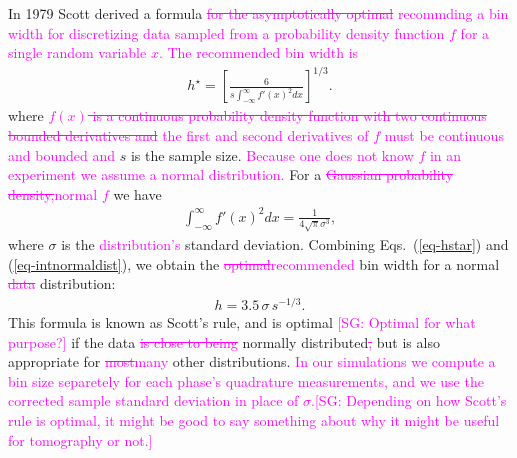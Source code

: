 \documentclass[
reprint,
superscriptaddress,
showpacs,
amsmath,
amssymb,
aps,
pra,
longbibliography
]{revtex4-1}
\providecommand{\aucmnt}[1]{#1}
\providecommand{\editcolor}[2]{\textcolor{#1}{#2}}
\providecommand{\aucmnt}[1]{}
\providecommand{\editcolor}[2]{#2}
\newcommand{\SG}[1]{\editcolor{magenta}{#1}}
\newcommand{\SGs}[1]{\aucmnt{\editcolor{magenta}{\sout{#1}}}}
\newcommand{\SGc}[1]{\aucmnt{\editcolor{magenta}{[SG: #1]}}}
\begin{document}
In 1979 Scott derived a formula \SGs{for the asymptotically optimal}
\SG{recommding a bin width for discretizing data sampled from a
  probability density function $f$ for a single random variable
  $x$. The recommended bin width is}
\begin{eqnarray}
  h^{\star} = \left[ \frac{6}{s \int_{-\infty}^{\infty} f'(x)^2 dx} \right]^{1/3}.
  \label{eq-hstar}
\end{eqnarray}
where \SGs{$f(x)$ is a continuous probability density function with
  two continuous bounded derivatives and} \SG{the first and second
  derivatives of $f$ must be continuous and bounded and} $s$ is the
sample size. \SG{Because one does not know $f$ in an experiment we
  assume a normal distribution.} For a \SGs{Gaussian probability
  density,}\SG{normal $f$} we have
\begin{eqnarray}
  \int_{-\infty}^{\infty} f'(x)^2 dx = \frac{1}{4 \sqrt{\pi} \sigma ^3},
  \label{eq-intnormaldist}
\end{eqnarray}
where $\sigma$ is the \SG{distribution's} standard
deviation. Combining Eqs.~(\ref{eq-hstar}) and
(\ref{eq-intnormaldist}), we obtain the \SGs{optimal}\SG{recommended}
bin width for a normal \SGs{data} distribution:
\begin{eqnarray}
  h = 3.5 \, \sigma \, s^{-1/3}.
\end{eqnarray}
This formula is known as Scott's rule, and is optimal \SGc{Optimal for
  what purpose?} if the data \SGs{is close to being} normally
distributed\SGs{,} but is also appropriate for \SGs{most}\SG{many}
other distributions.  \SG{In our simulations we compute a bin size
  separetely for each phase's quadrature measurements, and we use the
  corrected sample standard deviation in place of
  $\sigma$.}\SGc{Depending on how Scott's rule is optimal, it might be
  good to say something about why it might be useful for tomography or
  not.}
\end{document}
